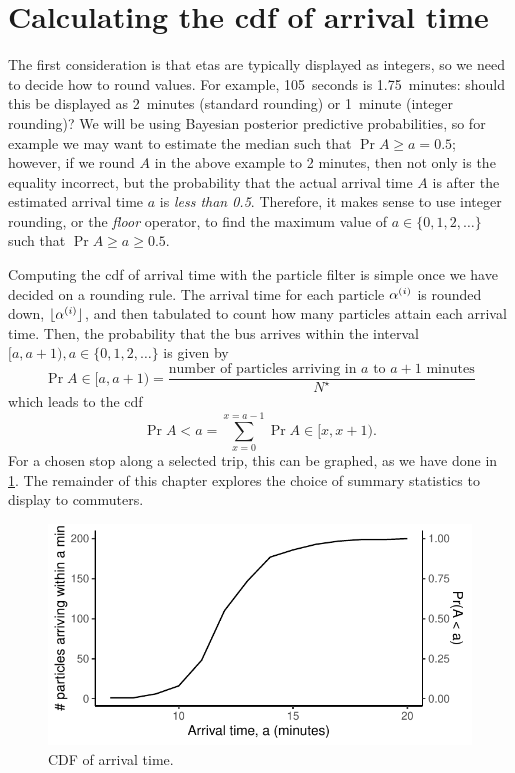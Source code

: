 
\section{Calculating the \gls{cdf} of arrival time}
\label{sec:etas_cdfs}

The first consideration is that \glspl{eta} are typically displayed as integers, so we need to decide how to round values. For example, 105~seconds is 1.75~minutes: should this be displayed as 2~minutes (standard rounding) or 1~minute (integer rounding)? We will be using Bayesian posterior predictive probabilities, so for example we may want to estimate the median such that $\Pr{A \geq a} = 0.5$; however, if we round $A$ in the above example to 2 minutes, then not only is the equality incorrect, but the probability that the actual arrival time $A$ is after the estimated arrival time $a$ is \emph{less than 0.5}. Therefore, it makes sense to use integer rounding, or the \emph{floor} operator, to find the maximum value of $a \in \{0, 1, 2, \ldots\}$ such that $\Pr{A \geq a} \geq 0.5$.


Computing the \gls{cdf} of arrival time with the particle filter is simple once we have decided on a rounding rule. The arrival time for each particle $\alpha^{(i)}$ is rounded down, $\lfloor\alpha^{(i)}\rfloor$, and then tabulated to count how many particles attain each arrival time. Then, the probability that the bus arrives within the interval $[a, a+1), a\in\{0,1,2,\ldots\}$ is given by
\begin{equation}
\label{eq:pf_pdf_arrivaltime}
\Pr{A \in [a, a+1)} =
\frac{\text{number of particles arriving in $a$ to $a+1$~minutes}}{N^\star}
\end{equation}
which leads to the \gls{cdf}
\begin{equation}
\label{eq:pf_cdf_arrivaltime}
\Pr{A < a} = \sum_{x=0}^{x=a-1} \Pr{A \in [x, x+1)}.
\end{equation}
For a chosen stop along a selected trip, this can be graphed, as we have done in \cref{fig:eta_cdf}. The remainder of this chapter explores the choice of summary statistics to display to commuters.

\begin{knitrout}\small
{}\color{fgcolor}\begin{figure}

{\centering \includegraphics[width=.6\textwidth]{figure/eta_cdf-1} 

}

\caption[CDF of arrival time]{CDF of arrival time.}\label{fig:eta_cdf}
\end{figure}


\end{knitrout}
